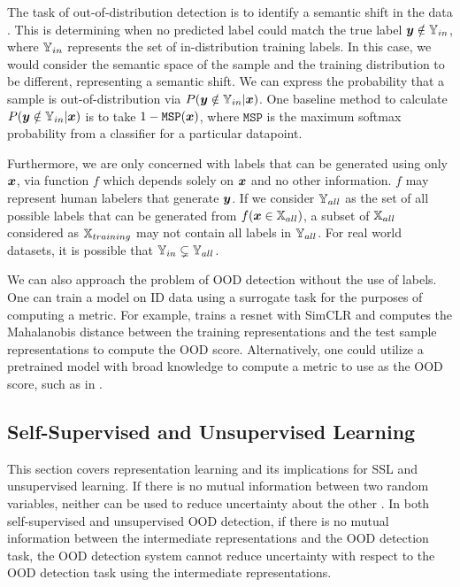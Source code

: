\documentclass[11pt, oneside]{book}
\theoremstyle{plain}
\theoremstyle{definition}
\theoremstyle{remark}
\begin{document}
The task of out-of-distribution detection is to identify a semantic shift in the data \citep{yang2021generalized}. This is determining when no predicted label could match the true label ${\bm{y}} \notin {\mathbb{Y}}_{in}$, where ${\mathbb{Y}}_{in}$ represents the set of in-distribution training labels. In this case, we would consider the semantic space of the sample and the training distribution to be different, representing a semantic shift. We can express the probability that a sample is out-of-distribution via $P({\bm{y}} \notin {\mathbb{Y}}_{in} | {\bm{x}})$. One baseline method to calculate $P({\bm{y}} \notin {\mathbb{Y}}_{in} | {\bm{x}})$ is to take $1 - \texttt{MSP}({\bm{x}})$, where $\texttt{MSP}$ is the maximum softmax probability from a classifier for a particular datapoint.

Furthermore, we are only concerned with labels that can be generated using only ${\bm{x}}$, via function $f$ which depends solely on ${\bm{x}}$ and no other information. $f$ may represent human labelers that generate ${\bm{y}}$. If we consider ${\mathbb{Y}}_{all}$ as the set of all possible labels that can be generated from $f({\bm{x}} \in {\mathbb{X}}_{all})$, a subset of ${\mathbb{X}}_{all}$ considered as ${\mathbb{X}}_{training}$ may not contain all labels in ${\mathbb{Y}}_{all}$. For real world datasets, it is possible that ${\mathbb{Y}}_{in} \subsetneq {\mathbb{Y}}_{all}$.

We can also approach the problem of OOD detection without the use of labels. One can train a model on ID data using a surrogate task for the purposes of computing a metric. For example, \citet{sehwag2021ssd} trains a resnet with SimCLR and computes the Mahalanobis distance between the training representations and the test sample representations to compute the OOD score. Alternatively, one could utilize a pretrained model with broad knowledge to compute a metric to use as the OOD score, such as in \citet{wang2023clipn}.

\subsection{Self-Supervised and Unsupervised Learning}

This section covers representation learning and its implications for SSL and unsupervised learning. If there is no mutual information between two random variables, neither can be used to reduce uncertainty about the other \citep{shannon1948mathematical}. In both self-supervised and unsupervised OOD detection, if there is no mutual information between the intermediate representations and the OOD detection task, the OOD detection system cannot reduce uncertainty with respect to the OOD detection task using the intermediate representations.
\end{document}
